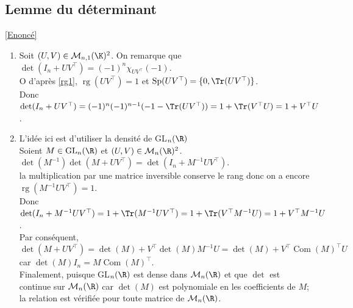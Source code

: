 \documentclass{book}
\begin{document}
	\subsection{Lemme du déterminant}\label{sec:lemme-du-determinant}
	\textcolor{blue}{\hyperref[Lemme du déterminant]{[Enoncé]}}\\
	\begin{enumerate}
		\item Soit $(U,V)\in\mathcal{M}_{n,1}(\K)^2$.
		On remarque que $\det(I_n+UV^\top)=(-1)^n\chi_{UV^\top}(-1)$.
		\\O d'après \ref{rg1}, $\operatorname{rg}(UV^\top)=1$ et $\operatorname{Sp}(UV^\top)=\{0,\Tr(UV^\top)\}$.
		\\Donc $\det(I_n+UV^\top)=(-1)^n(-1)^{n-1}(-1-\Tr(UV^\top))=1+\Tr(V^\top U)=1+V^\top U$.
		\item L'idée ici est d'utiliser la densité de GL$_n(\R)$\\Soient $M\in \text{GL}_n(\R)$ et $(U,V)\in\mathcal{M}_n(\R)^2$.
		$\det(M^{-1})\det(M+UV^\top)=\det(I_n+M^{-1}UV^\top)$.\\ la multiplication par une matrice inversible conserve le rang donc on a encore $\operatorname{rg}(M^{-1}UV^\top)=1$.\\
		Donc $\det(I_n+M^{-1}UV^\top)=1+\Tr(M^{-1}UV^\top)=1+\Tr(V^\top M^{-1}U)=1+V^\top M^{-1}U$.
		\\ Par conséquent, $\det(M+UV^\top)=\det(M)+V^\top\det(M)M^{-1}U=\det(M)+V^\top\operatorname{Com}(M)^\top U$ car $\det(M)I_n=M\operatorname{Com}(M)^\top$.
		\\Finalement, puisque GL$_n(\R)$ est dense dans $\mathcal{M}_n(\R)$ et que $\det$ est continue sur $\mathcal{M}_n(\R)$ car $\det(M)$ est polynomiale en les coefficients de $M$; la relation est vérifiée pour toute matrice de $\mathcal{M}_n(\R)$.
	\end{enumerate}
	
\end{document}
